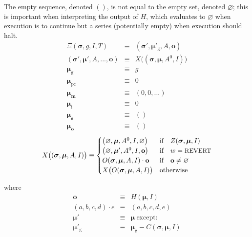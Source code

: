 \documentclass[9pt,oneside]{amsart}
\begin{document}
\begin{multicols}{2}
\hypertarget{empty_sequence_vs_empty_set}{}The empty sequence, denoted $()$, is not equal to the empty set, denoted $\varnothing$; this is important when interpreting the output of $H$, which evaluates to $\varnothing$ when execution is to continue but a series (potentially empty) when execution should halt.
\begin{eqnarray}
\Xi(\boldsymbol{\sigma}, g, I, T) & \equiv & (\boldsymbol{\sigma}'\!, \boldsymbol{\mu}'_{\mathrm{g}}, A, \mathbf{o}) \\
(\boldsymbol{\sigma}', \boldsymbol{\mu}'\!, A, ..., \mathbf{o}) & \equiv & X\big((\boldsymbol{\sigma}, \boldsymbol{\mu}, A^0\!, I)\big) \\
\boldsymbol{\mu}_{\mathrm{g}} & \equiv & g \\
\boldsymbol{\mu}_{\mathrm{pc}} & \equiv & 0 \\
\boldsymbol{\mu}_{\mathbf{m}} & \equiv & (0, 0, ...) \\
\boldsymbol{\mu}_{\mathrm{i}} & \equiv & 0 \\
\boldsymbol{\mu}_{\mathbf{s}} & \equiv & () \\
\boldsymbol{\mu}_{\mathbf{o}} & \equiv & ()
\end{eqnarray}
\begin{equation} \label{eq:X-def}
X\big( (\boldsymbol{\sigma}, \boldsymbol{\mu}, A, I) \big) \equiv \begin{cases}
\big(\varnothing, \boldsymbol{\mu}, A^0, I, \varnothing\big) & \text{if} \quad Z(\boldsymbol{\sigma}, \boldsymbol{\mu}, I) \\
\big(\varnothing, \boldsymbol{\mu}', A^0, I, \mathbf{o}\big) & \text{if} \quad w = \text{\small REVERT} \\
O(\boldsymbol{\sigma}, \boldsymbol{\mu}, A, I) \cdot \mathbf{o} & \text{if} \quad \mathbf{o} \neq \varnothing \\
X\big(O(\boldsymbol{\sigma}, \boldsymbol{\mu}, A, I)\big) & \text{otherwise} \\
\end{cases}
\end{equation}

where
\begin{eqnarray}
\mathbf{o} & \equiv & H(\boldsymbol{\mu}, I) \\
(a, b, c, d) \cdot e & \equiv & (a, b, c, d, e) \\
\boldsymbol{\mu}' & \equiv & \boldsymbol{\mu}\ \text{except:} \\
\boldsymbol{\mu}'_{\mathrm{g}} & \equiv & \boldsymbol{\mu}_{\mathrm{g}} - C(\boldsymbol{\sigma}, \boldsymbol{\mu}, I)
\end{eqnarray}


\end{multicols}
\end{document}
